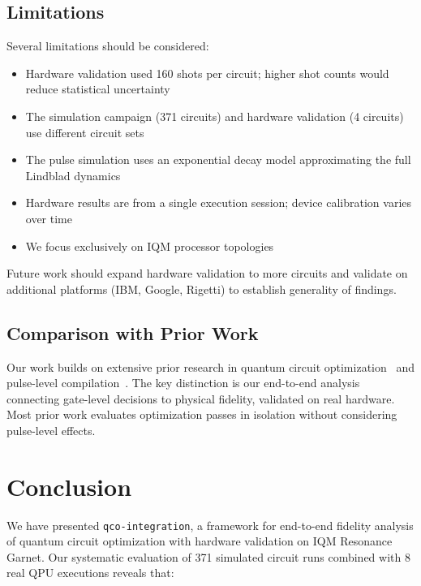 \documentclass[journal]{IEEEtran}
\begin{document}
\subsection{Limitations}

Several limitations should be considered:

\begin{itemize}
    \item Hardware validation used 160 shots per circuit; higher shot counts would reduce statistical uncertainty
    \item The simulation campaign (371 circuits) and hardware validation (4 circuits) use different circuit sets
    \item The pulse simulation uses an exponential decay model approximating the full Lindblad dynamics
    \item Hardware results are from a single execution session; device calibration varies over time
    \item We focus exclusively on IQM processor topologies
\end{itemize}

Future work should expand hardware validation to more circuits and validate on additional platforms (IBM, Google, Rigetti) to establish generality of findings.

\subsection{Comparison with Prior Work}

Our work builds on extensive prior research in quantum circuit optimization~\cite{nam2018automated, kissinger2020reducing} and pulse-level compilation~\cite{shi2019optimized}. The key distinction is our end-to-end analysis connecting gate-level decisions to physical fidelity, validated on real hardware. Most prior work evaluates optimization passes in isolation without considering pulse-level effects.

\section{Conclusion}
\label{sec:conclusion}

We have presented \texttt{qco-integration}, a framework for end-to-end fidelity analysis of quantum circuit optimization with hardware validation on IQM Resonance Garnet. Our systematic evaluation of 371 simulated circuit runs combined with 8 real QPU executions reveals that:
\end{document}

